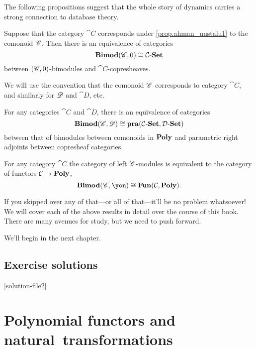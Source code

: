 \documentclass[Book-Poly]{subfiles}
\begin{document}
The following propositions suggest that the whole story of dynamics carries a strong connection to database theory.

\begin{proposition}
Suppose that the category $\cat{C}$ corresponds under \cref{prop.ahman_uustalu1} to the comonoid $\mathscr{C}$. Then there is an equivalence of categories
\[
\mathbf{Bimod}(\mathscr{C},0)\cong\mathcal{C}\textnormal{-}\mathbf{Set}
\]
between $(\mathscr{C},0)$-bimodules and $\cat{C}$-copresheaves.
\end{proposition}
We will use the convention that the comonoid $\mathscr{C}$ corresponds to category $\cat{C}$, and similarly for $\mathscr{D}$ and $\cat{D}$, etc. 

\begin{proposition}[Garner]
For any categories $\cat{C}$ and $\cat{D}$, there is an equivalence of categories
\[
\mathbf{Bimod}(\mathscr{C},\mathscr{D})\cong\mathbf{pra}(\mathcal{C}\textnormal{-}\mathbf{Set},\mathcal{D}\textnormal{-}\mathbf{Set})
\]
between that of bimodules between comonoids in $\mathbf{Poly}$ and parametric right adjoints between copresheaf categories.
\end{proposition}

\begin{proposition}
For any category $\cat{C}$ the category of left $\mathscr{C}$-modules is equivalent to the category of functors $\mathcal{C}\to\mathbf{Poly}$,
\[\Cat{Bimod}(\com{C},\yon)\cong\Cat{Fun}(\cat{C},\poly).\]
\end{proposition}

If you skipped over any of that---or all of that---it'll be no problem whatsoever! We will cover each of the above results in detail over the course of this book. There are many avenues for study, but we need to push forward.

We'll begin in the next chapter.


\section{Exercise solutions}
{\footnotesize
}

[solution-file2]

\chapter{Polynomial functors and natural~transformations} \label{ch.poly.func_nat}
\end{document}
